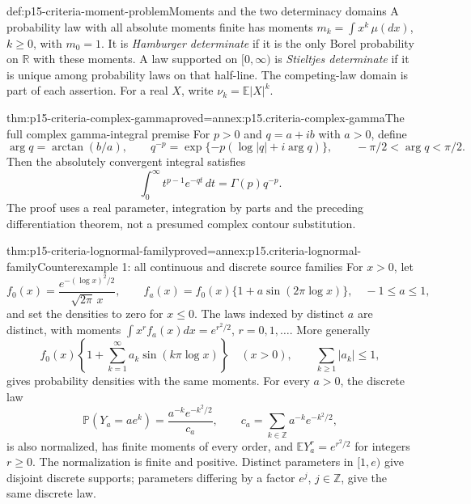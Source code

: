 \begin{hbdefinition}{def:p15-criteria-moment-problem}{Moments and the two determinacy domains}
A probability law with all absolute moments finite has moments
\(m_k=\int x^k\,\mu(dx)\), \(k\geq0\), with \(m_0=1\).
It is \emph{Hamburger determinate} if it is the only Borel
probability on \(\mathbb R\) with these moments.
A law supported on \([0,\infty)\) is \emph{Stieltjes determinate}
if it is unique among probability laws on that half-line.
The competing-law domain is part of each assertion.
For a real \(X\), write \(\nu_k=\mathbb E|X|^k\).
\end{hbdefinition}

\begin{hbtheorem}{thm:p15-criteria-complex-gamma}{proved=annex:p15.criteria-complex-gamma}{The full complex gamma-integral premise}
For \(p>0\) and \(q=a+ib\) with \(a>0\), define
\[
 \arg q=\arctan(b/a),\qquad
 q^{-p}=\exp\{-p(\log|q|+i\arg q)\},\qquad
             -\pi/2<\arg q<\pi/2.
\]
Then the absolutely convergent integral satisfies
\[
 \int_0^\infty t^{p-1}e^{-qt}\,dt=\Gamma(p)q^{-p}.
\]
The proof uses a real parameter, integration by parts and
the preceding differentiation theorem, not a presumed
complex contour substitution.
\end{hbtheorem}

\begin{hbtheorem}{thm:p15-criteria-lognormal-family}{proved=annex:p15.criteria-lognormal-family}{Counterexample 1: all continuous and discrete source families}
For \(x>0\), let
\[
 f_0(x)=\frac{e^{-(\log x)^2/2}}{\sqrt{2\pi}\,x},
 \qquad
 f_a(x)=f_0(x)\{1+a\sin(2\pi\log x)\},\quad -1\leq a\leq1,
\]
and set the densities to zero for \(x\leq0\).
The laws indexed by distinct \(a\) are distinct, with moments
\(\int x^r f_a(x)dx=e^{r^2/2}\), \(r=0,1,\ldots\).
More generally
\[
 f_0(x)\left\{1+\sum_{k=1}^\infty a_k\sin(k\pi\log x)\right\}
 \quad(x>0),\qquad \sum_{k\geq1}|a_k|\leq1,
\]
gives probability densities with the same moments.
For every \(a>0\), the discrete law
\[
 \mathbb P(Y_a=ae^k)=\frac{a^{-k}e^{-k^2/2}}{c_a},
 \qquad c_a=\sum_{k\in\mathbb Z}a^{-k}e^{-k^2/2},
\]
is also normalized, has finite moments of every order, and
\(\mathbb EY_a^r=e^{r^2/2}\) for integers \(r\geq0\).
The normalization is finite and positive. Distinct parameters
in \([1,e)\) give disjoint discrete supports; parameters
differing by a factor \(e^j\), \(j\in\mathbb Z\), give
the same discrete law.
\end{hbtheorem}

